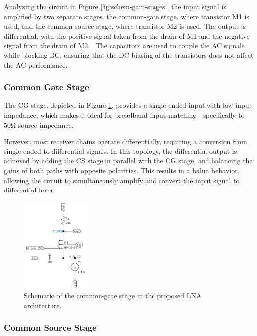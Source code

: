 Analyzing the circuit in Figure \ref{fig:schem-gain-stages}, the input signal is amplified by two separate stages, the common-gate stage, where transistor M1 is used, and the common-source stage, where transistor M2 is used. The output is differential, with the positive signal taken from the drain of M1 and the negative signal from the drain of M2. ~The capacitors are used to couple the AC signals while blocking DC, ensuring that the DC biasing of the transistors does not affect the AC performance. 

\subsubsection{Common Gate Stage}

The CG stage, depicted in Figure \ref{fig:schem-cg}, provides a single-ended input with low input impedance, which makes it ideal for broadband input matching—specifically to $50 \si{\ohm}$ source impedance.

However, most receiver chains operate differentially, requiring a conversion from single-ended to differential signals. In this topology, the differential output is achieved by adding the CS stage in parallel with the CG stage, and balancing the gains of both paths with opposite polarities. This results in a balun behavior, allowing the circuit to simultaneously amplify and convert the input signal to differential form.

\begin{figure}[H]
    \centering
    \includegraphics[width=0.3\textwidth]{Images/schem-CG.png}
    \caption{Schematic of the common-gate stage in the proposed LNA architecture.}
    \label{fig:schem-cg}
\end{figure}

\subsubsection{Common Source Stage}

